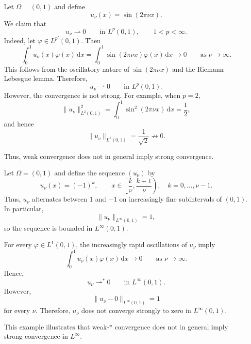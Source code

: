 \begin{example}
    \label{ex:weak-convergence}

    Let $\Omega=(0,1)$ and define
    \[
        u_\nu(x)=\sin(2\pi \nu x).
    \]
    We claim that
    \[
        u_\nu\rightharpoonup 0
        \qquad\text{in }L^p(0,1),
        \qquad 1<p<\infty.
    \]
    Indeed, let $\varphi\in L^{p'}(0,1)$. Then
    \[
        \int_0^1
        u_\nu(x)\varphi(x)\,\mathrm{d}x
        =
        \int_0^1
        \sin(2\pi \nu x)\varphi(x)\,\mathrm{d}x
        \longrightarrow 0
        \qquad\text{as }\nu\rightarrow\infty.
    \]
    This follows from the oscillatory nature of $\sin(2\pi\nu x)$
    and the Riemann--Lebesgue lemma. Therefore,
    \[
        u_\nu\rightharpoonup0
        \qquad\text{in }L^p(0,1).
    \]
    However, the convergence is not strong. For example, when $p=2$,
    \[
        \|u_\nu\|_{L^2(0,1)}^2
        =
        \int_0^1\sin^2(2\pi\nu x)\,\mathrm{d}x
        =
        \frac12,
    \]
    and hence
    \[
        \|u_\nu\|_{L^2(0,1)}
        =
        \frac{1}{\sqrt{2}}
        \not\longrightarrow0.
    \]
    
    Thus, weak convergence does not in general imply strong convergence.
\end{example}

\begin{example}
    \label{ex:weak-star-convergence}

    Let $\Omega=(0,1)$ and define the sequence $(u_\nu)$ by
    \[
        u_\nu(x)
        =
        (-1)^k,
        \qquad
        x\in
        \left[\frac{k}{\nu},\frac{k+1}{\nu}\right),
        \quad
        k=0,\ldots,\nu-1.
    \]
    Thus, $u_\nu$ alternates between $1$ and $-1$ on increasingly
    fine subintervals of $(0,1)$. In particular,
    \[
        \|u_\nu\|_{L^\infty(0,1)}=1,
    \]
    so the sequence is bounded in $L^\infty(0,1)$.

    For every $\varphi\in L^1(0,1)$, the increasingly rapid oscillations
    of $u_\nu$ imply
    \[
        \int_0^1 u_\nu(x)\varphi(x)\,\mathrm{d}x
        \longrightarrow 0
        \qquad\text{as }\nu\rightarrow\infty.
    \]
    Hence,
    \[
        u_\nu\rightharpoonup^*0
        \qquad\text{in }L^\infty(0,1).
    \]
    However,
    \[
        \|u_\nu-0\|_{L^\infty(0,1)}
        =
        1
    \]
    for every $\nu$. Therefore, $u_\nu$ does not converge strongly to
    zero in $L^\infty(0,1)$.

    This example illustrates that weak-$*$ convergence does not in
    general imply strong convergence in $L^\infty$.
\end{example}

